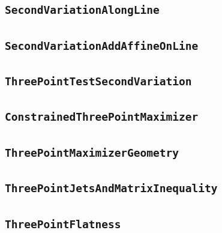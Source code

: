 \documentclass[11pt]{amsart}
\theoremstyle{definition}
\begin{document}
\subsection{\texorpdfstring{\texttt{SecondVariationAlongLine}}{SecondVariationAlongLine}}\label{node:SecondVariationAlongLine}


\subsection{\texorpdfstring{\texttt{SecondVariationAddAffineOnLine}}{SecondVariationAddAffineOnLine}}\label{node:SecondVariationAddAffineOnLine}


\subsection{\texorpdfstring{\texttt{ThreePointTestSecondVariation}}{ThreePointTestSecondVariation}}\label{node:ThreePointTestSecondVariation}


\subsection{\texorpdfstring{\texttt{ConstrainedThreePointMaximizer}}{ConstrainedThreePointMaximizer}}\label{node:ConstrainedThreePointMaximizer}


\subsection{\texorpdfstring{\texttt{ThreePointMaximizerGeometry}}{ThreePointMaximizerGeometry}}\label{node:ThreePointMaximizerGeometry}


\subsection{\texorpdfstring{\texttt{ThreePointJetsAndMatrixInequality}}{ThreePointJetsAndMatrixInequality}}\label{node:ThreePointJetsAndMatrixInequality}


\subsection{\texorpdfstring{\texttt{ThreePointFlatness}}{ThreePointFlatness}}\label{node:ThreePointFlatness}

\end{document}
